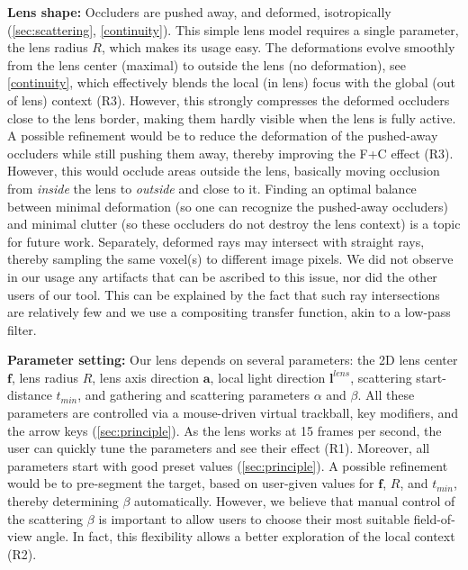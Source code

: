 \par \textbf{Lens shape:} Occluders are pushed away, and deformed, isotropically (\autoref{sec:scattering}, \autoref{continuity}). This simple lens model requires a single parameter, the lens radius $R$, which makes its usage easy. The deformations evolve smoothly from the lens center (maximal) to outside the lens (no deformation), see \autoref{continuity}, which effectively blends the local (in lens) focus with the global (out of lens) context (R3). However, this strongly compresses the deformed occluders close to the lens border, making them hardly visible when the lens is fully active. A possible refinement would be to reduce the deformation of the pushed-away occluders while still pushing them away, thereby improving the F+C effect (R3). However, this would occlude areas outside the lens, basically moving occlusion from \emph{inside} the lens to \emph{outside} and close to it. Finding an optimal balance between minimal deformation (so one can recognize the pushed-away occluders) and minimal clutter (so these occluders do not destroy the lens context) is a topic for future work. Separately, deformed rays may intersect with straight rays, thereby sampling the same voxel(s) to different image pixels. We did not observe in our usage any artifacts that can be ascribed to this issue, nor did the other users of our tool. This can be explained by the fact that such ray intersections are relatively few and we use a compositing transfer function, akin to a low-pass filter.


\par \textbf{Parameter setting:} Our lens depends on several parameters: the 2D lens center $\mathbf{f}$, lens radius $R$, lens axis direction $\mathbf{a}$, local light direction $\mathbf{l}^{lens}$, scattering start-distance $t_{min}$, and gathering and scattering parameters $\alpha$ and $\beta$. All these parameters are controlled via a mouse-driven virtual trackball, key modifiers, and the arrow keys (\autoref{sec:principle}). As the lens works at 15 frames per second, the user can quickly tune the parameters and see their effect (R1). Moreover, all parameters start with good preset values (\autoref{sec:principle}). A possible refinement would be to pre-segment the target, based on user-given values for $\mathbf{f}$, $R$, and $t_{min}$, thereby determining $\beta$ automatically. However, we believe that manual control of the scattering $\beta$ is important to allow users to choose their most suitable field-of-view angle. In fact, this flexibility allows a better exploration of the local context (R2).


